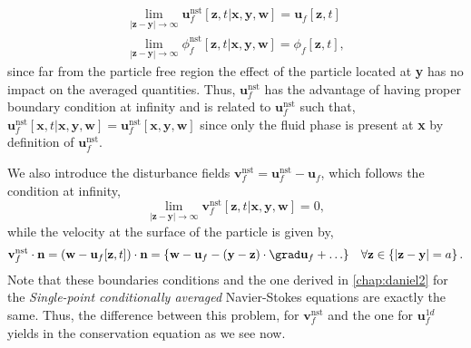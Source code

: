 \begin{align*}
    \lim_{|\textbf{z} - \textbf{y}|\to \infty}
    \textbf{u}^\text{nst}_f[\textbf{z},t|\textbf{x},\textbf{y},\textbf{w}]
    = \textbf{u}_f[\textbf{z},t]\\
    \lim_{|\textbf{z} - \textbf{y}|\to \infty}
    \phi^\text{nst}_f[\textbf{z},t|\textbf{x},\textbf{y},\textbf{w}]
    = \phi_f[\textbf{z},t],
    \label{eq:boundary}
\end{align*}
since far from the particle free region the effect of the particle located at \textbf{y} has no impact on the averaged quantities. 
Thus, $\textbf{u}^\text{nst}_f$ has the advantage of having proper boundary condition at infinity and is related to $\textbf{u}_f^\text{nst}$ such that, $\textbf{u}^\text{nst}_f[\textbf{x},t|\textbf{x},\textbf{y},\textbf{w}] = \textbf{u}_f^\text{nst}[\textbf{x},\textbf{y},\textbf{w}]$ since only the fluid phase is present at \textbf{x} by definition of $\textbf{u}^\text{nst}_f$. 

We also introduce the disturbance fields $\textbf{v}_f^\text{nst} = \textbf{u}_f^\text{nst} - \textbf{u}_f$, which follows the condition at infinity, 
\begin{equation}
    \lim_{|\textbf{z} - \textbf{y}|\to \infty}
    \textbf{v}^\text{nst}_f[\textbf{z},t|\textbf{x},\textbf{y},\textbf{w}]
    = 0,
\end{equation}
while the velocity at the surface of the particle is given by, 
\begin{equation}
    \textbf{v}^\text{nst}_f\cdot \textbf{n}
    = 
    (\textbf{w} - \textbf{u}_f[\textbf{z},t])\cdot \textbf{n}
    = 
    \left\{
        \textbf{w}
        - \textbf{u}_f
        - (\textbf{y} - \textbf{z})\cdot \grad\textbf{u}_f
        + \ldots 
    \right\}
    \;\;\; \forall \textbf{z}\in \left\{ |\textbf{z} - \textbf{y}| = a  \right\}. 
    \label{eq:bounday2}
\end{equation}
Note that these boundaries conditions and the one derived in \ref{chap:daniel2} for the \textit{Single-point conditionally averaged} Navier-Stokes equations  are exactly the same.
Thus, the difference between this problem, for $\textbf{v}_f^\text{nst}$ and the one for $\textbf{u}_f^{1d}$ yields in the conservation equation as we see now. 


